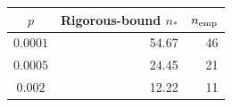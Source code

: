 \begin{tabular}{crr}
\toprule
$p$ & Rigorous-bound $n_*$ & $n_{\rm emp}$\\
\midrule
$0.0001$ & 54.67 & 46 \\ 
$0.0005$ & 24.45 & 21 \\ 
$0.002$ & 12.22 & 11 \\ 
\bottomrule
\end{tabular}
